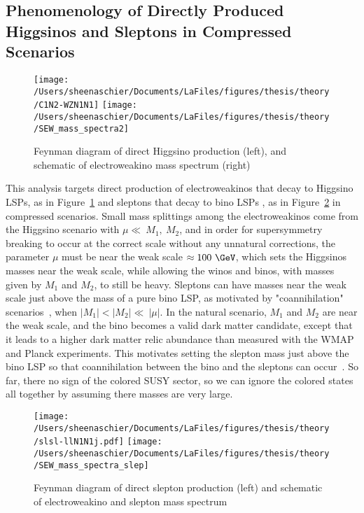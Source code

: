 \subsection{Phenomenology of Directly Produced Higgsinos and Sleptons in Compressed Scenarios}
\label{sec:pheno}
 \begin{figure}%
  \begin{center}
  \texttt{[image: /Users/sheenaschier/Documents/LaFiles/figures/thesis/theory/C1N2-WZN1N1]}
  \texttt{[image: /Users/sheenaschier/Documents/LaFiles/figures/thesis/theory/SEW\_mass\_spectra2]}
   \end{center}
 \caption{Feynman diagram of direct Higgsino production (left), and schematic of electroweakino mass spectrum (right)}
 \label{fig:fn1}
 \end{figure}
This analysis targets direct production of electroweakinos that decay to  Higgsino LSPs, as in Figure~\ref{fig:fn1} and sleptons that decay to bino LSPs , as in Figure~\ref{fig:fn2} in compressed scenarios.  Small mass splittings among the electroweakinos come from the Higgsino scenario with $\mu\ll~M_1,~M_2$, and in order for supersymmetry breaking to occur at the correct scale without any unnatural corrections, the parameter $\mu$ must be near the weak scale $\approx 100~\GeV$, which sets the Higgsinos masses near the weak scale, while allowing the winos and binos, with masses given by $M_1$ and $M_2$, to still be heavy.  Sleptons can have masses near the weak scale just above the mass of a pure bino LSP, as motivated by "coannihilation" scenarios~\cite{seckel}, when $|M_1| <|M_2|\ll~|\mu|$.  In the natural scenario, $M_1$ and $M_2$ are near the weak scale, and the bino becomes a valid dark matter candidate, except that it leads to a higher dark matter relic abundance than measured with the WMAP and Planck experiments.  This motivates setting the slepton mass just above the bino LSP so that coannihilation between the bino and the sleptons can occur~\cite{gondolo}.  So far, there no sign of the colored SUSY sector, so we can ignore the colored states all together by assuming there masses are very large.  
   \begin{figure}%
  \begin{center}
  \texttt{[image: /Users/sheenaschier/Documents/LaFiles/figures/thesis/theory/slsl-llN1N1j.pdf]}
   \texttt{[image: /Users/sheenaschier/Documents/LaFiles/figures/thesis/theory/SEW\_mass\_spectra\_slep]}
   \end{center}
 \caption{Feynman diagram of direct slepton production (left) and schematic of electroweakino and slepton mass spectrum}
 \label{fig:fn2}
  \end{figure}

